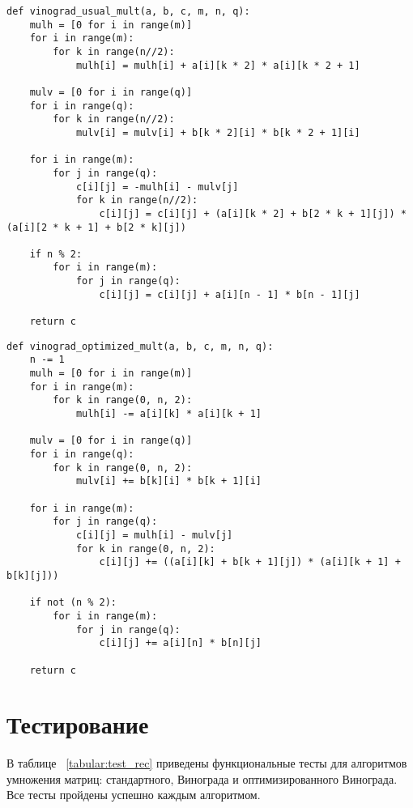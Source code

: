 \clearpage
\begin{lstlisting}[caption=Алгоритм умножения матриц Винограда,
	label={vin}]
def vinograd_usual_mult(a, b, c, m, n, q):
	mulh = [0 for i in range(m)]
	for i in range(m):
		for k in range(n//2):
			mulh[i] = mulh[i] + a[i][k * 2] * a[i][k * 2 + 1]
	
	mulv = [0 for i in range(q)]
	for i in range(q):
		for k in range(n//2):
			mulv[i] = mulv[i] + b[k * 2][i] * b[k * 2 + 1][i]
	
	for i in range(m):
		for j in range(q):
			c[i][j] = -mulh[i] - mulv[j]
			for k in range(n//2):
				c[i][j] = c[i][j] + (a[i][k * 2] + b[2 * k + 1][j]) * (a[i][2 * k + 1] + b[2 * k][j])
	
	if n % 2:
		for i in range(m):
			for j in range(q):
				c[i][j] = c[i][j] + a[i][n - 1] * b[n - 1][j]
	
	return c
\end{lstlisting}

\clearpage
\begin{lstlisting}[caption=Оптимизированный алгоритм умножения матриц Винограда,
	label={vin_opt}]
def vinograd_optimized_mult(a, b, c, m, n, q):
	n -= 1
	mulh = [0 for i in range(m)]
	for i in range(m):
		for k in range(0, n, 2):
			mulh[i] -= a[i][k] * a[i][k + 1]
	
	mulv = [0 for i in range(q)]
	for i in range(q):
		for k in range(0, n, 2):
			mulv[i] += b[k][i] * b[k + 1][i]
	
	for i in range(m):
		for j in range(q):
			c[i][j] = mulh[i] - mulv[j]
			for k in range(0, n, 2):
				c[i][j] += ((a[i][k] + b[k + 1][j]) * (a[i][k + 1] + b[k][j]))
	
	if not (n % 2):
		for i in range(m):
			for j in range(q):
				c[i][j] += a[i][n] * b[n][j]
	
	return c
\end{lstlisting}


\clearpage
\section{Тестирование}
В таблице ~\ref{tabular:test_rec} приведены функциональные тесты для алгоритмов умножения матриц: стандартного, Винограда и оптимизированного Винограда. Все тесты пройдены успешно каждым алгоритмом.

